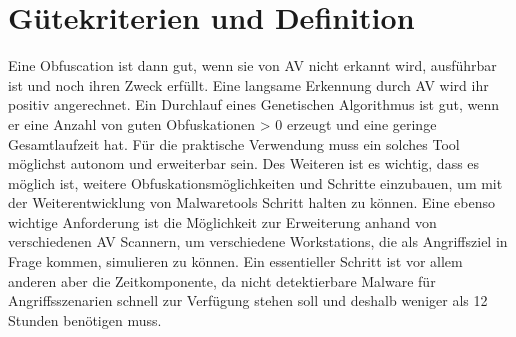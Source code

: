 \section{Gütekriterien und Definition}
\label{Methode:Kriterien}
Eine Obfuscation ist dann gut, wenn sie von AV nicht erkannt wird, ausführbar ist und noch ihren Zweck erfüllt. Eine langsame Erkennung durch AV wird ihr positiv angerechnet. Ein Durchlauf eines Genetischen Algorithmus ist gut, wenn er eine Anzahl von guten Obfuskationen > 0 erzeugt und eine geringe Gesamtlaufzeit hat.
Für die praktische Verwendung muss ein solches Tool möglichst autonom und erweiterbar sein. Des Weiteren ist es wichtig, dass es möglich ist, weitere Obfuskationsmöglichkeiten und Schritte einzubauen, um mit der Weiterentwicklung von Malwaretools Schritt halten zu können. Eine ebenso wichtige Anforderung ist die Möglichkeit zur Erweiterung anhand von verschiedenen AV Scannern, um verschiedene Workstations, die als Angriffsziel in Frage kommen, simulieren zu können.
Ein essentieller Schritt ist vor allem anderen aber die Zeitkomponente, da nicht detektierbare Malware für Angriffsszenarien schnell zur Verfügung stehen soll und deshalb weniger als 12 Stunden benötigen muss.